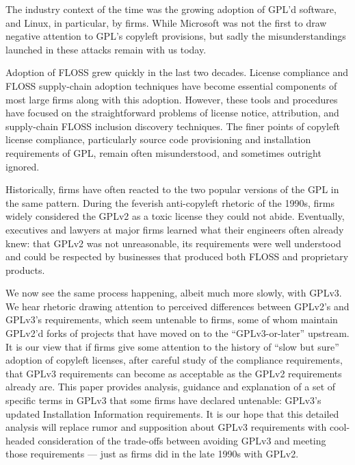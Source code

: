 The industry context of the time was the growing adoption of GPL'd software,
and Linux, in particular, by firms.  While Microsoft was not the first to
draw negative attention to GPL's copyleft provisions, but sadly the
misunderstandings launched in these attacks remain with us today.

Adoption of FLOSS grew quickly in the last two decades.  License compliance
and FLOSS supply-chain adoption techniques have become essential components
of most large firms along with this adoption.  However, these tools and
procedures have focused on the straightforward problems of license notice,
attribution, and supply-chain FLOSS inclusion discovery techniques.  The
finer points of copyleft license compliance, particularly source code
provisioning and installation requirements of GPL, remain often
misunderstood, and sometimes outright ignored.

Historically, firms have often reacted to the two popular versions of the GPL
in the same pattern.  During the feverish anti-copyleft rhetoric of the
1990s, firms widely considered the GPLv2 as a toxic license they could not
abide.  Eventually, executives and lawyers at major firms learned what their
engineers often already knew: that GPLv2 was not unreasonable, its
requirements were well understood and could be respected by businesses that
produced both FLOSS and proprietary products.

We now see the same process happening, albeit much more slowly, with GPLv3.
We hear rhetoric drawing attention to perceived differences between GPLv2's
and GPLv3's requirements, which seem untenable to firms, some of whom
maintain GPLv2'd forks of projects that have moved on to the
``GPLv3-or-later'' upstream.  It is our view that if firms give some
attention to the history of ``slow but sure'' adoption of copyleft licenses,
after careful study of the compliance requirements, that GPLv3 requirements
can become as acceptable as the GPLv2 requirements already are.  This paper
provides analysis, guidance and explanation of a set of specific terms in
GPLv3 that some firms have declared untenable: GPLv3's updated Installation
Information requirements.  It is our hope that this detailed analysis will
replace rumor and supposition about GPLv3 requirements with cool-headed
consideration of the trade-offs between avoiding GPLv3 and meeting those
requirements --- just as firms did in the late 1990s with GPLv2.


